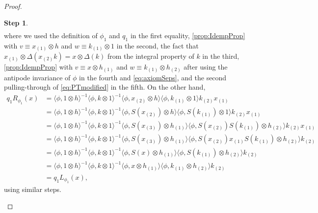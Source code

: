 \documentclass[a4paper,10pt]{amsart}
\newcommand{\eval}[2]{\langle #1 , #2\rangle}
\theoremstyle{definition}
\newtheorem{step-goursat}{Step}
\begin{document}
\begin{proof}
\begin{step-goursat}
\begin{align*}
    \end{align*}
    where we used the definition of $\phi_1$ and $q_1$ in the first equality, \cref{prop:IdempProp} with $v\equiv x_{(1)}\otimes h$ and $w\equiv k_{(1)} \otimes 1$ in the second, the fact that $x_{(1)} \otimes \Delta(x_{(2)}k)= x \otimes \Delta(k)$ from the integral property of $k$ in the third, \cref{prop:IdempProp} with $v\equiv x\otimes h_{(1)}$ and $w\equiv k_{(1)} \otimes h_{(2)}$ after using the antipode invariance of $\phi$ in the fourth and \cref{eq:axiomSeps}, and the second pulling-through of \cref{eq:PTmodified} in the fifth.
    On the other hand,
    \begin{align*}
            q_1 R_{\phi_1}(x) 
        &=
            \eval{\phi}{1\otimes h}^{-1}
                \eval{\phi}{k\otimes 1}^{-1}
                    \eval{\phi}{x_{(2)}\otimes h}
                        \eval{\phi}{k_{(1)}\otimes 1}
                            k_{(2)}x_{(1)}
        \\
        &=
            \eval{\phi}{1\otimes h}^{-1}
                \eval{\phi}{k\otimes 1}^{-1}
                    \eval{\phi}{S(x_{(2)})\otimes h}
                        \eval{\phi}{S( k_{(1)})\otimes 1}
                            k_{(2)}x_{(1)}
        \\
        &=
            \eval{\phi}{1\otimes h}^{-1}
                \eval{\phi}{k\otimes 1}^{-1}
                    \eval{\phi}{S(x_{(3)})\otimes h_{(1)}}
                        \eval{\phi}{S(x_{(2)}) S(k_{(1)})\otimes h_{(2)}}
                            k_{(2)} x_{(1)}
        \\
        &=
            \eval{\phi}{1\otimes h}^{-1}
                \eval{\phi}{k\otimes 1}^{-1}
                    \eval{\phi}{S(x_{(3)})\otimes h_{(1)}}
                        \eval{\phi}{S(x_{(2)}) x_{(1)} S(k_{(1)})\otimes h_{(2)}}
                            k_{(2)}
        \\
        &=
            \eval{\phi}{1\otimes h}^{-1}
                \eval{\phi}{k\otimes 1}^{-1}
                    \eval{\phi}{S(x)\otimes h_{(1)}} \eval{\phi}{ S(k_{(1)})\otimes h_{(2)}} k_{(2)}\\
        &=
            \eval{\phi}{1\otimes h}^{-1}
                \eval{\phi}{k\otimes 1}^{-1}
                    \eval{\phi}{x\otimes h_{(1)}}
                        \eval{\phi}{ k_{(1)}\otimes h_{(2)}}
                            k_{(2)}\\
        &= 
        q_1 L_{\phi_1}(x),
    \end{align*}
    using similar steps.

\end{step-goursat}
\end{proof}
\end{document}
